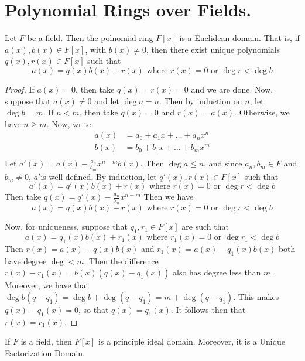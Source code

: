 \section{Polynomial Rings over Fields.}

\begin{theorem}\label{3.2.1}
    Let $F$ be a field. Then the polnomial ring $F[x]$ is a Euclidean domain.
    That is, if $a(x),b(x) \in F[x]$, with $b(x) \neq 0$, then there exist
    unique polynomials $q(x), r(x) \in F[x]$ such that
    \begin{equation*}
        a(x)=q(x)b(x)+r(x) \text{ where } r(x)=0 \text{ or } \deg{r}<\deg{b}
    \end{equation*}
\end{theorem}
\begin{proof}
    If $a(x)=0$, then take $q(x)=r(x)=0$ and we are done. Now, suppose that
    $a(x) \neq 0$ and let $\deg{a}=n$. Then by induction on $n$, let
    $\deg{b}=m$. If $n<m$, then take  $q(x)=0$ and $r(x)=a(x)$. Otherwise, we
    have $n \geq m$. Now, write
    \begin{align*}
        a(x)    &=  a_0+a_1x+\dots+a_nx^n   \\
        b(x)    &=  b_0+b_1x+\dots+b_mx^m   \\
    \end{align*}
    Let $a'(x)=a(x)-\frac{a_n}{b_m}x^{n-m}b(x)$. Then $\deg{a} \leq n$, and
    since $a_n,b_m \in F$ and  $b_m \neq 0$,  $a'$is well defined. By induction,
    let  $q'(x),r(x) \in F[x]$ such that
    \begin{equation*}
        a'(x)=q'(x)b(x)+r(x) \text{ where } r(x)=0 \text{ or } \deg{r}<\deg{b}
    \end{equation*}
    Then take $q(x)=q'(x)-\frac{a_n}{b_m}x^{n-m}$ Then we have
    \begin{equation*}
        a(x)=q(x)b(x)+r(x) \text{ where } r(x)=0 \text{ or } \deg{r}<\deg{b}
    \end{equation*}

    Now, for uniqueness, suppose that $q_1,r_1 \in F[x]$ are such that
    \begin{equation*}
        a(x)=q_1(x)b(x)+r_1(x) \text{ where } r_1(x)=0 \text{ or } \deg{r_1}<\deg{b}
    \end{equation*}
    Then $r(x)=a(x)-q(x)b(x)$ and $r_1(x)=a(x)-q_1(x)b(x)$ both have degree
    $\deg<m$. Then the difference  $r(x)-r_1(x)=b(x)(q(x)-q_1(x))$ also has
    degree less than $m$. Moreover, we have that
    $\deg{b(q-q_1)}=\deg{b}+\deg{(q-q_1)}=m+\deg{(q-q_1)}$. This makes
    $q(x)-q_1(x)=0$, so that $q(x)=q_1(x)$. It follows then that $r(x)=r_1(x)$.
\end{proof}
\begin{corollary}
    If $F$ is a field, then $F[x]$ is a principle ideal domain. Moreover, it is
    a Unique Factorization Domain.
\end{corollary}

